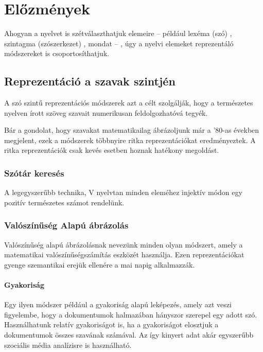 \chapter{Előzmények}
\label{ch:related_work}

Ahogyan a nyelvet is szétválaszthatjuk elemeire – például lexéma (szó) , szintagma (szószerkezet) , mondat – , úgy a nyelvi elemeket reprezentáló módszereket is csoportosíthatjuk. 


\section{Reprezentáció a szavak szintjén}

A szó szintű reprezentációs módszerek azt a célt szolgálják, hogy a természetes nyelven írott szöveg szavait numerikusan feldolgozhatóvá tegyék.

Bár a gondolat, hogy szavakat matematikailag ábrázoljunk már a '80-as években megjelent, ezek a módszerek többnyire ritka reprezentációkat eredményeztek. A ritka reprezentációk csak kevés esetben hoznak hatékony megoldást.

\subsection{Szótár keresés}

A legegyszerűbb technika, V nyelvtan minden eleméhez injektív módon egy pozitív természetes számot rendelünk.

\subsection{Valószínűség Alapú ábrázolás}

Valószínűség alapú ábrázolásnak nevezünk minden olyan módszert, amely a matematikai valószínűségszámítás eszközét használja. Ezen reprezentációkat gyenge szemantikai erejük ellenére a mai napig alkalmazzák.

\subsubsection{Gyakoriság}

Egy ilyen módszer például a gyakoriság alapú leképezés, amely azt veszi figyelembe, hogy a dokumentumok halmazában hányszor szerepel egy adott szó. Használhatunk relatív gyakoriságot is, ha a gyakoriságot elosztjuk a dokumentumok összes szavának számával. Az így kinyert adat akár egyszerűbb szociális média analízisre is használható.



